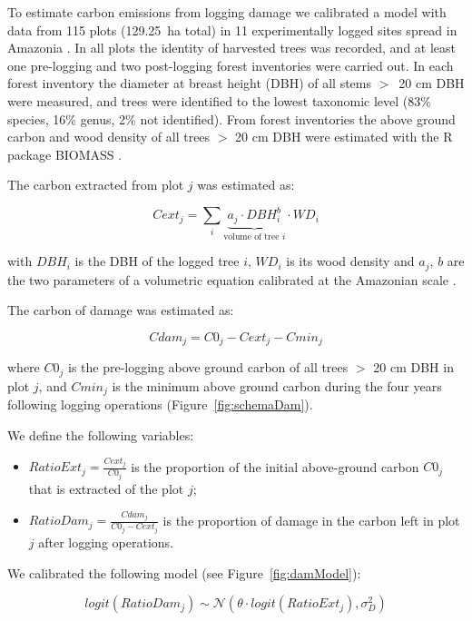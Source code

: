 \documentclass[12pt]{article}
\begin{document}
To estimate carbon emissions from logging damage we calibrated a model with data from 115 plots (129.25~ha total) in 11 experimentally logged sites spread in Amazonia \cite{Sist2015}. In all plots the identity of harvested trees was recorded, and at least one pre-logging and two post-logging forest inventories were carried out. In each forest inventory the diameter at breast height (DBH) of all stems $>$~20 cm DBH were measured, and trees were identified to the lowest taxonomic level (83\% species, 16\% genus, 2\% not identified). 
From forest inventories the above ground carbon and wood density of all trees $>$ 20 cm DBH  were estimated with the R package BIOMASS \cite{Rejou-Mechain2017}. 

The carbon extracted from plot $j$ was estimated as: 

\begin{equation}
    Cext_j = \sum_{i} \underbrace{a_j \cdot DBH_i^b}_{\text{volume of tree $i$}} \cdot WD_i
\end{equation}

with $DBH_i$ is the DBH of the logged tree $i$, $WD_i$ is its wood density and $a_j$, $b$ are the two parameters of a volumetric equation calibrated at the Amazonian scale \cite{Piponiot2019}. 

The carbon of damage was estimated as: 

\begin{equation}
    Cdam_j = C0_j - Cext_j - Cmin_j
\end{equation}

where $C0_j$ is the pre-logging above ground carbon of all trees $>$ 20 cm DBH in plot $j$, and $Cmin_j$ is the minimum above ground carbon during the four years following logging operations (Figure~\ref{fig:schemaDam}). 

We define the following variables: 

\begin{itemize}
    \item $RatioExt_j=\frac{Cext_j}{C0_j}$ is the proportion of the initial above-ground carbon $C0_j$ that is extracted of the plot $j$; 
    \item $RatioDam_j = \frac{Cdam_j}{C0_j-Cext_j}$ is the proportion of damage in the carbon left in plot $j$ after logging operations. 
\end{itemize}

We calibrated the following model (see Figure~\ref{fig:damModel}): 

\begin{equation}
logit(RatioDam_j) \sim \mathcal{N}(\theta \cdot logit(RatioExt_j), \sigma_D^2)
\end{equation} 
\end{document}
